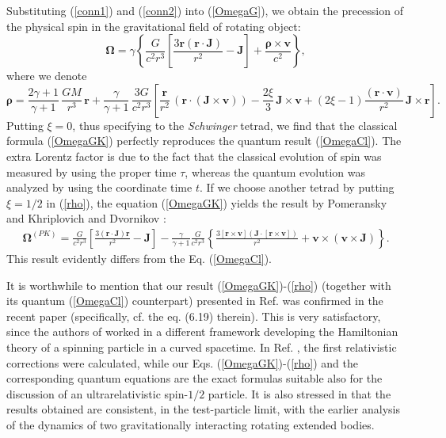 \documentclass[preprint,showpacs,preprintnumbers,amsmath,amssymb]{revtex4}
\begin{document}
Substituting (\ref{conn1}) and (\ref{conn2}) into (\ref{OmegaG}), we obtain
the precession of the physical spin in the gravitational field of rotating
object:
\begin{equation}\label{OmegaGK}
{\bm \Omega} = \gamma\left\{{\frac G{c^2r^3}}\left[{\frac {3{\bm r}({\bm r}
\cdot{\bm J})}{r^2}}-{\bm J}\right] + {\frac {{\bm \rho}\times {\bm v}}{c^2}}\right\},
\end{equation}
where we denote
\begin{equation}\label{rho}
{\bm \rho} = {\frac {2\gamma + 1}{\gamma + 1}}\,{\frac {GM}{r^3}}\,{\bm r}
+ {\frac {\gamma}{\gamma + 1}}\,{\frac {3G}{c^2r^3}}\left[{\frac {{\bm r}}{r^2}}
\,({\bm r}\cdot({\bm J}\times{\bm v})) - {\frac {2\xi}3}\,{\bm J}\times{\bm v}
+ (2\xi - 1){\frac {({\bm r}\cdot{\bm v})}{r^2}}\,{\bm J}\times{\bm r}\right].
\end{equation}
Putting $\xi = 0$, thus specifying to the {\it Schwinger} tetrad, we find
that the classical formula (\ref{OmegaGK}) perfectly reproduces the quantum
result (\ref{OmegaCl}). The extra Lorentz factor is due to the fact that the
classical evolution of spin was measured by using the proper time $\tau$,
whereas the quantum evolution was analyzed by using the coordinate time $t$.
If we choose another tetrad by putting $\xi = 1/2$
in (\ref{rho}), the equation (\ref{OmegaGK}) yields the result by
Pomeransky and Khriplovich \cite{PK} and Dvornikov
\cite{Dvornikov}:
\begin{equation} \begin{array}{c}
\bm\Omega^{(PK)}%
= \frac{G}{c^2r^3} \left[\frac{3(\bm
r\cdot\bm J)\bm r}{r^2} - \bm J\right] -\frac{\gamma}{\gamma+1}
\frac{G}{c^2r^3}\left\{\frac{3[\bm r\times\bm v](\bm J
\cdot[\bm r\times\bm v])}{r^2} + \bm v\times(\bm v\times\bm J)\right\}.
\end{array} \label{OmePKtr}
\end{equation}
This result evidently differs from the Eq. (\ref{OmegaCl}).

It is worthwhile to mention that our result
(\ref{OmegaGK})-(\ref{rho}) (together with its quantum
(\ref{OmegaCl}) counterpart) presented in Ref. \cite{preprintLT}
was confirmed in the recent paper \cite{barausse} (specifically, cf.
the eq. (6.19) therein). This is very
satisfactory, since the authors of \cite{barausse} worked in a
different framework developing the Hamiltonian theory of a
spinning particle in a curved spacetime. In Ref. \cite{barausse},
the first relativistic corrections were calculated, while our Eqs.
(\ref{OmegaGK})-(\ref{rho}) and the corresponding quantum equations
are the exact formulas suitable also for the discussion of an
ultrarelativistic spin-$1/2$ particle. It is also stressed in
\cite{barausse} that the results obtained are consistent, in the
test-particle limit, with the earlier analysis \cite{jena} of the
dynamics of two gravitationally interacting rotating extended bodies.
\end{document}
